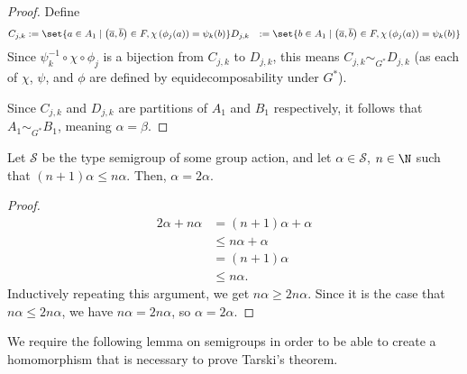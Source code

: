 \documentclass[10pt]{mypackage}
\begin{document}
\begin{proof}
    Define
    \begin{align*}
      C_{j,k} &:= \set{a\in A_1\mid \left(\overline{a},\overline{b}\right)\in F, \chi\left(\phi_j(a)\right) = \psi_k(b)}
      D_{j,k} &:= \set{b\in A_1\mid \left(\overline{a},\overline{b}\right)\in F, \chi\left(\phi_j(a)\right) = \psi_k(b)}
    \end{align*}
    Since $\psi^{-1}_{k}\circ \chi \circ \phi_j$ is a bijection from $C_{j,k}$ to $D_{j,k}$, this means $C_{j,k}\sim_{G^{\ast}}D_{j,k}$ (as each of $\chi$, $\psi$, and $\phi$ are defined by equidecomposability under $G^{\ast}$).\newline

    Since $C_{j,k}$ and $D_{j,k}$ are partitions of $A_1$ and $B_1$ respectively, it follows that $A_1\sim_{G^{\ast}}B_1$, meaning $\alpha = \beta$.
  \end{proof}
  \begin{corollary}
    Let $\mathcal{S}$ be the type semigroup of some group action, and let $\alpha \in \mathcal{S}$, $n\in \N$ such that $\left(n+1\right)\alpha \leq n\alpha$. Then, $\alpha = 2\alpha$.
  \end{corollary}
  \begin{proof}
    \begin{align*}
      2\alpha + n\alpha &= \left(n+1\right)\alpha + \alpha\\
                        &\leq n\alpha + \alpha\\
                        &= \left(n+1\right)\alpha\\
                        &\leq n\alpha.
    \end{align*}
    Inductively repeating this argument, we get $n\alpha \geq 2n\alpha$. Since it is the case that $n\alpha \leq 2n\alpha$, we have $n\alpha = 2n\alpha$, so $\alpha = 2\alpha$.
  \end{proof}
  We require the following lemma on semigroups in order to be able to create a homomorphism that is necessary to prove Tarski's theorem.
\end{document}
